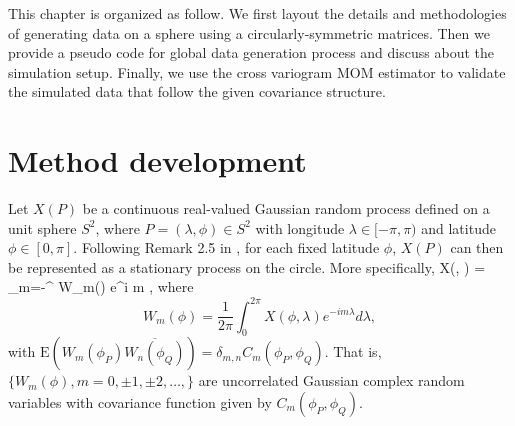 
This chapter is organized as follow. We first layout the details and methodologies of generating data on a sphere using a circularly-symmetric matrices. Then we provide a pseudo code for global data generation process and discuss about the simulation setup. Finally, we use the cross variogram MOM estimator to validate the simulated data that follow the given covariance 
structure.  
		

	\section{Method development}

Let $X(P)$ be a continuous real-valued Gaussian random process defined on a unit sphere $S^2$, where $P = (\lambda, \phi) \in S^2$ with longitude $\lambda \in [-\pi, \pi)$ and latitude $\phi \in [0, \pi]$. Following Remark 2.5 in \cite{Huang2012}, for each fixed latitude $\phi$, $X(P)$ can then be represented as a stationary process on the circle. More specifically,			
	\beq \label{eq:sym_process}
	X(\phi, \lambda) = \sum_{m=-\infty}^{\infty} W_m(\phi) e^{i m \lambda},
	\eeq
where		
	\[
		W_m(\phi) = \frac{1}{2\pi} \int_0^{2\pi} X(\phi, \lambda) e^{-i m \lambda} d \lambda,
	\]
with $\mbox{E}(W_m(\phi_P) \overline{W_n(\phi_Q)}) = \delta_{m,n} C_m(\phi_P, \phi_Q)$. That is, $\{W_m(\phi), m = 0, \pm 1, \pm 2, \ldots,\}$ are uncorrelated Gaussian complex random variables with covariance function given by $C_m(\phi_P, \phi_Q)$.		 \\	
			
